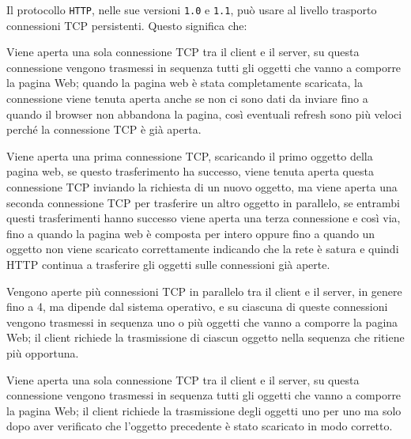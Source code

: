 \question[1]
Il protocollo \texttt{HTTP}, nelle sue versioni \texttt{1.0} e \texttt{1.1}, può usare al livello trasporto connessioni TCP persistenti. %
Questo significa che:

\begin{checkboxes}
	\choice Viene aperta una sola connessione TCP tra il client e il server, su questa connessione vengono trasmessi in sequenza tutti gli oggetti che vanno a comporre la pagina Web; %
	quando la pagina web è stata completamente scaricata, la connessione viene tenuta aperta anche se non ci sono dati da inviare fino a quando il browser non abbandona la pagina, così eventuali refresh sono più veloci perché la connessione TCP è già aperta.

	\choice Viene aperta una prima connessione TCP, scaricando il primo oggetto della pagina web, se questo trasferimento ha successo, viene tenuta aperta questa connessione TCP inviando la richiesta di un nuovo oggetto, ma viene aperta una seconda connessione TCP per trasferire un altro oggetto in parallelo, se entrambi questi trasferimenti hanno successo viene aperta una terza connessione e così via, fino a quando la pagina web è composta per intero oppure fino a quando un oggetto non viene scaricato correttamente indicando che la rete è satura e quindi HTTP continua a trasferire gli oggetti sulle connessioni già aperte.

	\CorrectChoice Vengono aperte più connessioni TCP in parallelo tra il client e il server, in genere fino a 4, ma dipende dal sistema operativo, e su ciascuna di queste connessioni vengono trasmessi in sequenza uno o più oggetti che vanno a comporre la pagina Web; %
	il client richiede la trasmissione di ciascun oggetto nella sequenza che ritiene più opportuna.

	\choice Viene aperta una sola connessione TCP tra il client e il server, su questa connessione vengono trasmessi in sequenza tutti gli oggetti che vanno a comporre la pagina Web; il client richiede la trasmissione degli oggetti uno per uno ma solo dopo aver verificato che l'oggetto precedente è stato scaricato in modo corretto.
\end{checkboxes}
